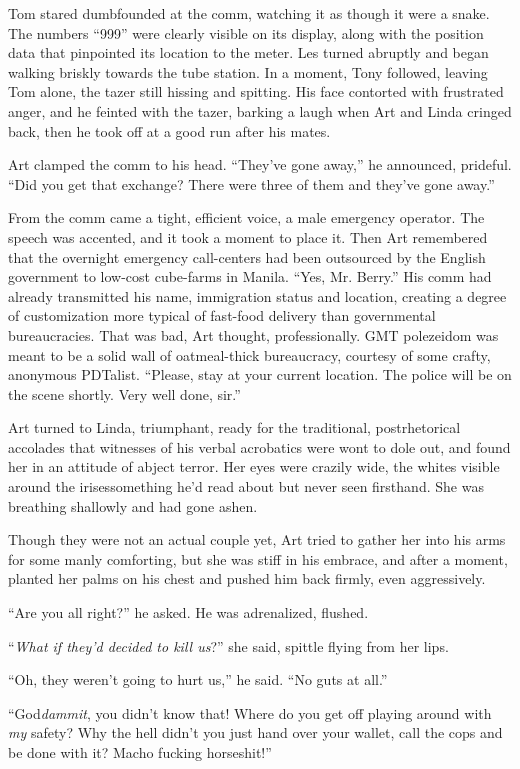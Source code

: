Tom stared dumbfounded at the comm, watching it as though it were a
snake. The numbers “999” were clearly visible on its display, along
with the position data that pinpointed its location to the meter.
Les turned abruptly and began walking briskly towards the tube
station. In a moment, Tony followed, leaving Tom alone, the tazer
still hissing and spitting. His face contorted with frustrated
anger, and he feinted with the tazer, barking a laugh when Art and
Linda cringed back, then he took off at a good run after his
mates.

Art clamped the comm to his head. “They’ve gone away,” he
announced, prideful. “Did you get that exchange? There were three
of them and they’ve gone away.”

From the comm came a tight, efficient voice, a male emergency
operator. The speech was accented, and it took a moment to place
it. Then Art remembered that the overnight emergency call-centers
had been outsourced by the English government to low-cost
cube-farms in Manila. “Yes, Mr. Berry.” His comm had already
transmitted his name, immigration status and location, creating a
degree of customization more typical of fast-food delivery than
governmental bureaucracies. That was bad, Art thought,
professionally. GMT polezeidom was meant to be a solid wall of
oatmeal-thick bureaucracy, courtesy of some crafty, anonymous
PDTalist. “Please, stay at your current location. The police will
be on the scene shortly. Very well done, sir.”

Art turned to Linda, triumphant, ready for the traditional,
postrhetorical accolades that witnesses of his verbal acrobatics
were wont to dole out, and found her in an attitude of abject
terror. Her eyes were crazily wide, the whites visible around the
irises{\dash}something he’d read about but never seen firsthand. She was
breathing shallowly and had gone ashen.

Though they were not an actual couple yet, Art tried to gather her
into his arms for some manly comforting, but she was stiff in his
embrace, and after a moment, planted her palms on his chest and
pushed him back firmly, even aggressively.

“Are you all right?” he asked. He was adrenalized, flushed.

“\emph{What if they’d decided to kill us}?” she said, spittle
flying from her lips.

“Oh, they weren’t going to hurt us,” he said. “No guts at all.”

“God\emph{dammit}, you didn’t know that! Where do you get off
playing around with \emph{my} safety? Why the hell didn’t you just
hand over your wallet, call the cops and be done with it? Macho
fucking horseshit!”

